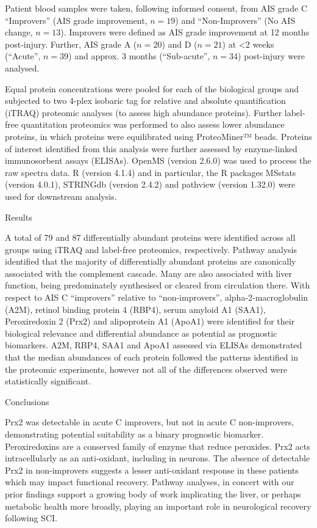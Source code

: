 \documentclass[
]{article}
\begin{document}
Patient blood samples were taken, following informed consent, from AIS grade C ``Improvers'' (AIS grade improvement, \(n = 19\)) and ``Non-Improvers'' (No AIS change, \(n = 13\)).
Improvers were defined as AIS grade improvement at 12 months post-injury.
Further, AIS grade A (\(n = 20\)) and D (\(n = 21\)) at \textless2 weeks (``Acute'', \(n = 39\)) and approx.
3 months (``Sub-acute'', \(n = 34\)) post-injury were analysed.

Equal protein concentrations were pooled for each of the biological groups and subjected to two 4-plex isobaric tag for relative and absolute quantification (iTRAQ) proteomic analyses (to assess high abundance proteins).
Further label-free quantitation proteomics was performed to also assess lower abundance proteins, in which proteins were equilibrated using ProteoMiner™ beads.
Proteins of interest identified from this analysis were further assessed by enzyme-linked immunosorbent assays (ELISAs).
OpenMS (version 2.6.0) was used to process the raw spectra data.
R (version 4.1.4) and in particular, the R packages MSstats (version 4.0.1), STRINGdb (version 2.4.2) and pathview (version 1.32.0) were used for downstream analysis.

Results

A total of 79 and 87 differentially abundant proteins were identified across all groups using iTRAQ and label-free proteomics, respectively.
Pathway analysis identified that the majority of differentially abundant proteins are canonically associated with the complement cascade.
Many are also associated with liver function, being predominately synthesised or cleared from circulation there.
With respect to AIS C ``improvers'' relative to ``non-improvers'', alpha-2-macroglobulin (A2M), retinol binding protein 4 (RBP4), serum amyloid A1 (SAA1), Peroxiredoxin 2 (Prx2) and alipoprotein A1 (ApoA1) were identified for their biological relevance and differential abundance as potential as prognostic biomarkers.
A2M, RBP4, SAA1 and ApoA1 assessed via ELISAs demonstrated that the median abundances of each protein followed the patterns identified in the proteomic experiments, however not all of the differences observed were statistically significant.

Conclusions

Prx2 was detectable in acute C improvers, but not in acute C non-improvers, demonstrating potential suitability as a binary prognostic biomarker.
Peroxiredoxins are a conserved family of enzyme that reduce peroxides.
Prx2 acts intracellularly as an anti-oxidant, including in neurons.
The absence of detectable Prx2 in non-improvers suggests a lesser anti-oxidant response in these patients which may impact functional recovery.
Pathway analyses, in concert with our prior findings support a growing body of work implicating the liver, or perhaps metabolic health more broadly, playing an important role in neurological recovery following SCI.
\end{document}
